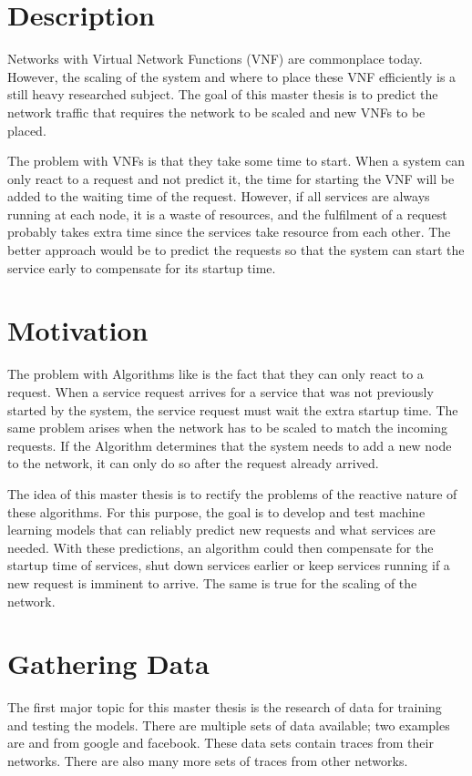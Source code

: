 \documentclass[12pt,a4paper]{article}
\begin{document}
	\section{Description}
	Networks with Virtual Network Functions (VNF) are commonplace today.
	However, the scaling of the system and where to place these VNF efficiently is a still heavy researched subject.
	The goal of this master thesis is to predict the network traffic that requires the network to be scaled and new VNFs to be placed.
	
	The problem with VNFs is that they take some time to start.
	When a system can only react to a request and not predict it, the time for starting the VNF will be added to the waiting time of the request.
	However, if all services are always running at each node, it is a waste of resources, and the fulfilment of a request probably takes extra time since the services take resource from each other.
	The better approach would be to predict the requests so that the system can start the service early to compensate for its startup time.
	
	\section{Motivation}
	The problem with Algorithms like \cite{draxlerScaling} is the fact that they can only react to a request.
	When a service request arrives for a service that was not previously started by the system, the service request must wait the extra startup time.
	The same problem arises when the network has to be scaled to match the incoming requests.
	If the Algorithm determines that the system needs to add a new node to the network, it can only do so after the request already arrived.
	
	The idea of this master thesis is to rectify the problems of the reactive nature of these algorithms.
	For this purpose, the goal is to develop and test machine learning models that can reliably predict new requests and what services are needed.
	With these predictions, an algorithm could then compensate for the startup time of services, shut down services earlier or keep services running if a new request is imminent to arrive.
	The same is true for the scaling of the network.
	
	\section{Gathering Data}
	The first major topic for this master thesis is the research of data for training and testing the models.
	There are multiple sets of data available; two examples are \cite{GoogleData} and \cite{FacebookData} from google and facebook.
	These data sets contain traces from their networks.
	There are also many more sets of traces from other networks.
	
\end{document}
